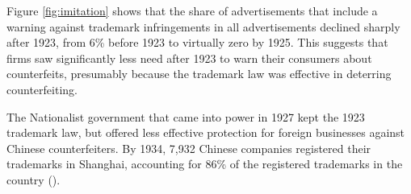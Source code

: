 \documentclass[12pt]{article}
\begin{document}
Figure \ref{fig:imitation} shows that the share of advertisements that include a warning against trademark infringements in all advertisements declined sharply after 1923,  from 6\% before 1923 to virtually zero by 1925. This suggests that firms saw significantly less need after 1923 to warn their consumers about counterfeits, presumably because the trademark law was effective in deterring counterfeiting. 

\begin{CJK*}{UTF8}{gbsn}

The Nationalist government that came into power in 1927 kept the 1923 trademark law, but offered less effective protection for foreign businesses against Chinese counterfeiters.  By 1934, 7,932 Chinese companies registered their trademarks in Shanghai, accounting for 86\% of the registered trademarks in the country  (\citealp{Motono2013}). %
\end{CJK*}


\end{document}
